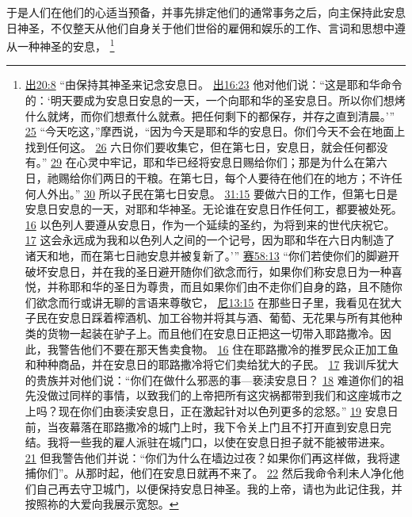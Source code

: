 \documentclass[12pt, a4paper, oneside]{ctexart}
\newcounter{parnum}[section]
\newcommand{\N}{%
   \noindent\refstepcounter{parnum}%
    \makebox[\parindent][l]{\textbf{\arabic{parnum}.}}}
\begin{document}
\N 于是人们在他们的心适当预备，并事先排定他们的通常事务之后，向主保持此安息日神圣，不仅整天从他们自身关于他们世俗的雇佣和娱乐的工作、言词和思想中遵从一种神圣的安息，
	\footnote {
		\href{https://biblehub.com/exodus/20-8.htm}{出20:8} “由保持其神圣来记念安息日。
		\href{https://biblehub.com/exodus/16-23.htm}{出16:23} 他对他们说：“这是耶和华命令的：‘明天要成为安息日安息的一天，一个向耶和华的圣安息日。所以你们想烤什么就烤，而你们想煮什么就煮。把任何剩下的都保存，并存之直到清晨。’”
		\href{https://biblehub.com/exodus/16-25.htm}{25} “今天吃这，”摩西说，“因为今天是耶和华的安息日。你们今天不会在地面上找到任何这。
		\href{https://biblehub.com/exodus/16-26.htm}{26} 六日你们要收集它，但在第七日，安息日，就会任何都没有。”
		\href{https://biblehub.com/exodus/16-29.htm}{29} 在心灵中牢记，耶和华已经将安息日赐给你们；那是为什么在第六日，祂赐给你们两日的干粮。在第七日，每个人要待在他们在的地方；不许任何人外出。”
		\href{https://biblehub.com/exodus/16-30.htm}{30} 所以子民在第七日安息。
		\href{https://biblehub.com/exodus/31-15.htm}{31:15} 要做六日的工作，但第七日是安息日安息的一天，对耶和华神圣。无论谁在安息日作任何工，都要被处死。
		\href{https://biblehub.com/exodus/31-16.htm}{16} 以色列人要遵从安息日，作为一个延续的圣约，为将到来的世代庆祝它。
		\href{https://biblehub.com/exodus/31-17.htm}{17} 这会永远成为我和以色列人之间的一个记号，因为耶和华在六日内制造了诸天和地，而在第七日祂安息并被复新了。’”
		\href{https://biblehub.com/isaiah/58-13.htm}{赛58:13} “你们若使你们的脚避开破坏安息日，并在我的圣日避开随你们欲念而行，如果你们称安息日为一种喜悦，并称耶和华的圣日为尊贵，而且如果你们由不走你们自身的路，且不随你们欲念而行或讲无聊的言语来尊敬它，
		\href{https://biblehub.com/nehemiah/13-15.htm}{尼13:15} 在那些日子里，我看见在犹大子民在安息日踩着榨酒机、加工谷物并将其与酒、葡萄、无花果与所有其他种类的货物一起装在驴子上。而且他们在安息日正把这一切带入耶路撒冷。因此，我警告他们不要在那天售卖食物。
		\href{https://biblehub.com/nehemiah/13-16.htm}{16} 住在耶路撒冷的推罗民众正加工鱼和种种商品，并在安息日的耶路撒冷将它们卖给犹大的子民。
		\href{https://biblehub.com/nehemiah/13-17.htm}{17} 我训斥犹大的贵族并对他们说：“你们在做什么邪恶的事---亵渎安息日？
		\href{https://biblehub.com/nehemiah/13-18.htm}{18} 难道你们的祖先没做过同样的事情，以致我们的上帝把所有这灾祸都带到我们和这座城市之上吗？现在你们由亵渎安息日，正在激起针对以色列更多的忿怒。”
		\href{https://biblehub.com/nehemiah/13-19.htm}{19} 安息日前，当夜幕落在耶路撒冷的城门上时，我下令关上门且不打开直到安息日完结。我将一些我的雇人派驻在城门口，以使在安息日担子就不能被带进来。
		\href{https://biblehub.com/nehemiah/13-21.htm}{21} 但我警告他们并说：“你们为什么在墙边过夜？如果你们再这样做，我将逮捕你们”。从那时起，他们在安息日就再不来了。
		\href{https://biblehub.com/nehemiah/13-22.htm}{22} 然后我命令利未人净化他们自己再去守卫城门，以便保持安息日神圣。我的上帝，请也为此记住我，并按照祢的大爱向我展示宽恕。
	}
\end{document}
